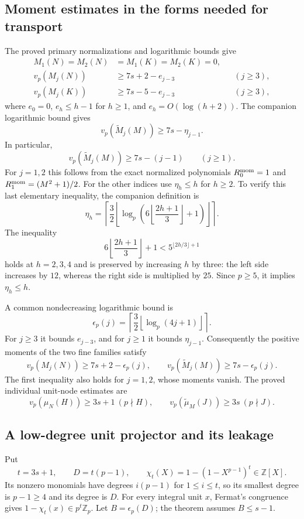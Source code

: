 \documentclass[11pt,letterpaper]{article}
\numberwithin{equation}{section}
\begin{document}
\subsection{Moment estimates in the forms needed for transport}
The proved primary normalizations and logarithmic bounds give
\begin{align}
 M_1(N)=M_2(N)&=M_1(K)=M_2(K)=0,\\
 v_p(M_j(N))&\ge7s+2-e_{j-3} &&(j\ge3),\\
 v_p(M_j(K))&\ge7s-5-e_{j-3} &&(j\ge3),
 \label{VIII-eq:e-coarse-moment-bound}
\end{align}
where $e_0=0$, $e_h\le h-1$ for $h\ge1$, and $e_h=O(\log(h+2))$.
The companion logarithmic bound gives
\[
 v_p(\widetilde M_j(M))\ge7s-\eta_{j-1}.
\]
In particular,
\begin{equation}\label{VIII-eq:e-companion-linear-loss}
 v_p(\widetilde M_j(M))\ge7s-(j-1)\qquad(j\ge1).
\end{equation}
For $j=1,2$ this follows from the exact normalized polynomials
$R_0^{\rm mom}=1$ and $R_1^{\rm mom}=(M^2+1)/2$. For the other
indices use $\eta_h\le h$ for $h\ge2$. To verify this last elementary
inequality, the companion definition is
\[
 \eta_h=\left\lceil\frac32
 \left\lfloor\log_p\left(6\left\lfloor\frac{2h+1}{3}\right\rfloor+1\right)
 \right\rfloor\right\rceil.
\]
The inequality
\[
 6\left\lfloor\frac{2h+1}{3}\right\rfloor+1
 <5^{\lfloor2h/3\rfloor+1}
\]
holds at $h=2,3,4$ and is preserved by increasing $h$ by three:
the left side increases by $12$, whereas the right side is multiplied
by $25$. Since $p\ge5$, it implies $\eta_h\le h$.

A common nondecreasing logarithmic bound is
\begin{equation}\label{VIII-eq:e-common-loss}
 \epsilon_p(j)=\left\lceil\frac32\left\lfloor
                       \log_p(4j+1)\right\rfloor\right\rceil.
\end{equation}
For $j\ge3$ it bounds $e_{j-3}$, and for $j\ge1$ it bounds
$\eta_{j-1}$. Consequently the positive moments of the two fine
families satisfy
\[
 v_p(M_j(N))\ge7s+2-\epsilon_p(j),\qquad
 v_p(\widetilde M_j(M))\ge7s-\epsilon_p(j).
\]
The first inequality also holds for $j=1,2$, whose moments vanish.
The proved individual unit-node estimates are
\begin{equation}\label{VIII-eq:e-unit-mass-bounds}
 v_p(\mu_N(H))\ge3s+1\ (p\nmid H),\qquad
 v_p(\widetilde\mu_M(J))\ge3s\ (p\nmid J).
\end{equation}

\subsection{A low-degree unit projector and its leakage}
Put
\[
 t=3s+1,\qquad D=t(p-1),\qquad
 \chi_t(X)=1-(1-X^{p-1})^t\in\mathbb Z[X].
\]
Its nonzero monomials have degrees $i(p-1)$ for $1\le i\le t$,
so its smallest degree is $p-1\ge4$ and its degree is $D$.
For every integral unit $x$, Fermat's congruence gives
$1-\chi_t(x)\in p^t\mathbb Z_p$.
Let $B=\epsilon_p(D)$; the theorem assumes $B\le s-1$.
\end{document}

